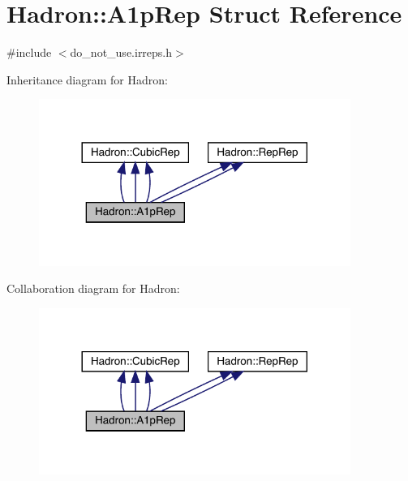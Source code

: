 \hypertarget{structHadron_1_1A1pRep}{}\section{Hadron\+:\+:A1p\+Rep Struct Reference}
\label{structHadron_1_1A1pRep}


{\ttfamily \#include $<$do\+\_\+not\+\_\+use.\+irreps.\+h$>$}



Inheritance diagram for Hadron\+:
\nopagebreak
\begin{figure}[H]
\begin{center}
\leavevmode
\includegraphics[width=288pt]{d9/d9e/structHadron_1_1A1pRep__inherit__graph}
\end{center}
\end{figure}


Collaboration diagram for Hadron\+:
\nopagebreak
\begin{figure}[H]
\begin{center}
\leavevmode
\includegraphics[width=288pt]{d7/dc8/structHadron_1_1A1pRep__coll__graph}
\end{center}
\end{figure}
